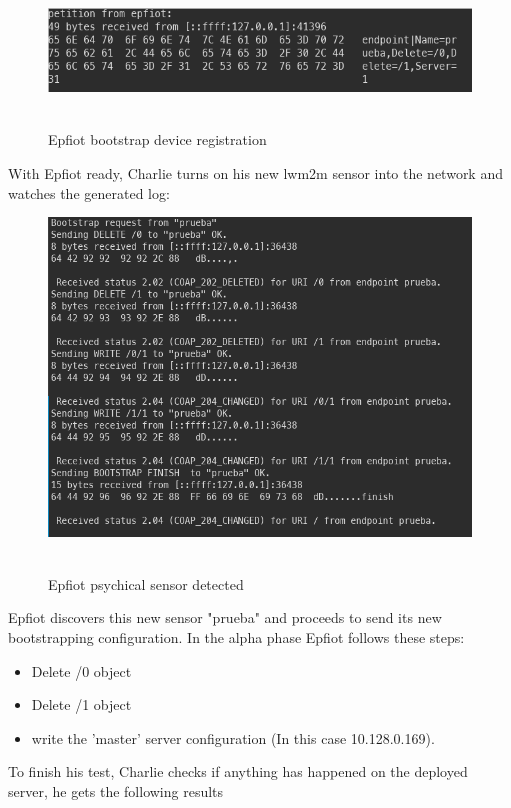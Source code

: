 \begin{figure}[h!]%
\centering
    \includegraphics[width=5.5in]{figures/bs_endpoint_log.png}
~\caption{Epfiot bootstrap device registration}
\label{figure6.14}
\end{figure}

With Epfiot ready, Charlie turns on his new lwm2m sensor into the network and watches the generated log:

\begin{figure}[h!]%
\centering
    \includegraphics[width=5.5in]{figures/bs_endpoint_log2.png}
~\caption{Epfiot psychical sensor detected}
\label{figure6.15}
\end{figure}

Epfiot discovers this new sensor "prueba" and proceeds to send its new bootstrapping configuration.
In the alpha phase Epfiot follows these steps:
\begin{itemize}
    \item Delete /0 object
    \item Delete /1 object
    \item write the 'master' server configuration (In this case 10.128.0.169).
\end{itemize}
\newpage

To finish his test, Charlie checks if anything has happened on the deployed server, he gets the following results

